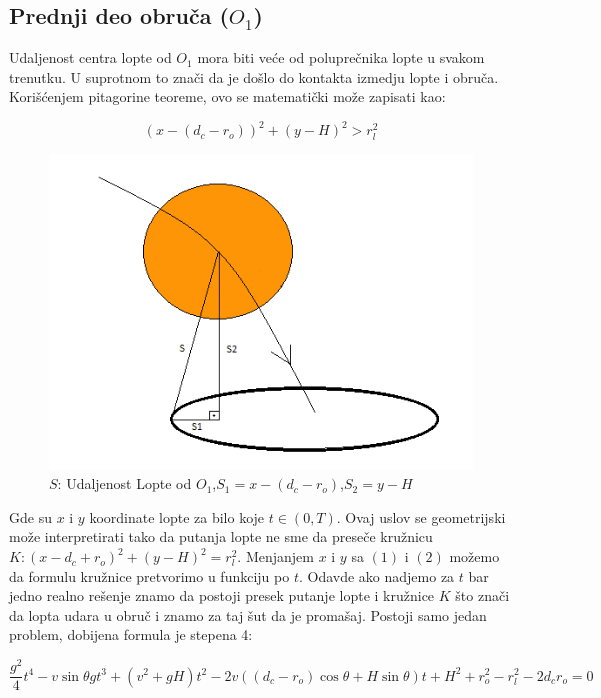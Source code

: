 \documentclass[a4paper, 12pt]{article}
\begin{document}
\subsection{Prednji deo obruča ($O_1$)}

Udaljenost centra lopte od $O_1$ mora biti veće od poluprečnika lopte u svakom trenutku. U suprotnom to znači da je došlo do kontakta izmedju lopte i obruča. Korišćenjem pitagorine teoreme, ovo se matematički može zapisati kao:

\begin{equation}
(x - (d_c - r_o))^2 + (y - H)^2 > r_l^2
\end{equation}


\begin{figure}[h]
\hspace*{3cm}
\includegraphics[scale=0.4]{pic4}
\caption{$S$: Udaljenost Lopte od $O_1$,\quad $S_1 = x - (d_c - r_o)$,\quad $S_2 = y-H$}
\end{figure}


Gde su $x$ i $y$ koordinate lopte za bilo koje $t \in (0, T)$. Ovaj uslov se geometrijski može interpretirati tako da putanja lopte ne sme da preseče kružnicu $K: (x - d_c + r_o)^2 + (y - H)^2 = r_l^2$. Menjanjem $x$ i $y$ sa $(1)$ i $(2)$ možemo da formulu kružnice pretvorimo u funkciju po $t$. Odavde ako nadjemo za $t$ bar jedno realno rešenje znamo da postoji presek putanje lopte i kružnice $K$ što znači da lopta udara u obruč i znamo za taj šut da je promašaj. Postoji samo jedan problem, dobijena formula je stepena 4:

\[ \dfrac{g^2}{4}t^4 - v \sin \theta g t^3 + (v^2 + gH)t^2 -2v((d_c-r_o) \cos \theta + H \sin \theta)t + H^2 + r_o^2 - r_l^2 - 2 d_c r_o = 0\]
\end{document}
